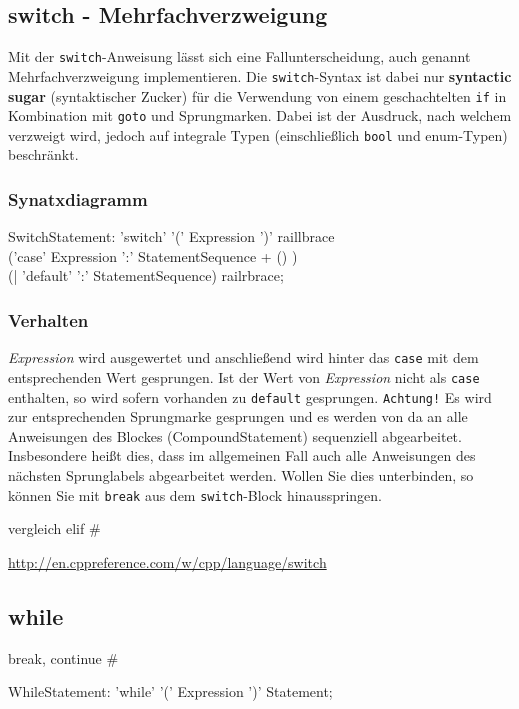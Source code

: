\documentclass[a4paper]{report}
\begin{document}
\subsection{switch - Mehrfachverzweigung}\label{switch}
Mit der \texttt{switch}-Anweisung lässt sich eine Fallunterscheidung, auch genannt Mehrfachverzweigung implementieren. Die \texttt{switch}-Syntax ist dabei nur \textbf{syntactic sugar} (syntaktischer Zucker) für die Verwendung von einem geschachtelten \texttt{if} in Kombination mit \texttt{goto} und Sprungmarken. Dabei ist der Ausdruck, nach welchem verzweigt wird, jedoch auf integrale Typen (einschließlich \texttt{bool} und enum-Typen) beschränkt.
\subsubsection{Synatxdiagramm}
\begin{rail}
	SwitchStatement: 'switch' '(' Expression ')'
						raillbrace \\
							('case' Expression ':' StatementSequence  + () ) \\
							(| 'default' ':' StatementSequence)				
						railrbrace;
\end{rail}

\subsubsection{Verhalten}
\textit{Expression} wird ausgewertet und anschließend wird hinter das \texttt{case} mit dem entsprechenden Wert gesprungen. Ist der Wert von \textit{Expression} nicht als \texttt{case} enthalten, so wird sofern vorhanden zu \texttt{default} gesprungen. \texttt{Achtung!} Es wird zur entsprechenden Sprungmarke gesprungen und es werden von da an alle Anweisungen des Blockes (CompoundStatement) sequenziell abgearbeitet. Insbesondere heißt dies, dass im allgemeinen Fall auch alle Anweisungen des nächsten Sprunglabels abgearbeitet werden. Wollen Sie dies unterbinden, so können Sie mit \texttt{break} aus dem \texttt{switch}-Block hinausspringen.

vergleich elif \#%

\url{http://en.cppreference.com/w/cpp/language/switch}

\subsection{while}
break, continue \# %
\begin{rail}
	WhileStatement: 'while' '(' Expression ')' Statement;
\end{rail}
\end{document}
